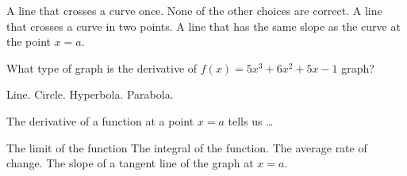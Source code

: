 \documentclass{exam}
\begin{document}
\begin{questions}
	\begin{choices}
		\choice A line that crosses a  curve once.
		\choice None of the other choices are correct.
		\choice A line that crosses a curve in two points.
		\CorrectChoice A line that has the same slope as the curve at the point $x = a$.
	\end{choices}
	\question What type of graph is the derivative of $f(x)= 5x^3+6x^2+5x-1$ graph?

	\begin{choices}
		\choice Line.
		\choice Circle.
		\choice Hyperbola.
		\CorrectChoice Parabola.
	\end{choices}
	\question The derivative of a function at a point $x = a$ tells us \ldots

	\begin{choices}
		\choice The limit of the function
		\choice The integral of the function.
		\choice The average rate of change.
		\CorrectChoice The slope of a tangent line of the graph at $x = a$.
	\end{choices}

\end{questions}
\end{document}
